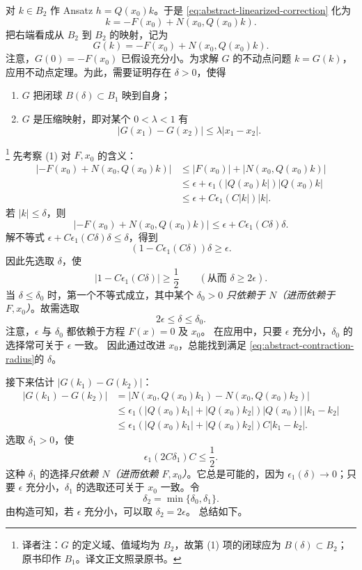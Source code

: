 对 $k\in B_2$ 作 Ansatz $h=Q(x_0)k$。于是
\eqref{eq:abstract-linearized-correction} 化为
\begin{equation}
 k=-F(x_0)+N(x_0,Q(x_0)k).
 \label{eq:abstract-fixed-point-equation}
\end{equation}
把右端看成从 $B_2$ 到 $B_2$ 的映射，记为
\[
 G(k)=-F(x_0)+N(x_0,Q(x_0)k).
\]
注意，$G(0)=-F(x_0)$ 已假设充分小。为求解 $G$ 的不动点问题 $k=G(k)$，
应用\personPicard{}不动点定理。为此，需要证明存在 $\delta>0$，使得
\begin{enumerate}[label=(\arabic*)]
\item $G$ 把闭球 $B(\delta)\subset B_1$ 映到自身；
\item $G$ 是压缩映射，即对某个 $0<\lambda<1$ 有
\[
 |G(x_1)-G(x_2)|\leq\lambda|x_1-x_2|.
\]
\end{enumerate}
\footnote{译者注：$G$ 的定义域、值域均为 $B_2$，故第 (1) 项的闭球应为
$B(\delta)\subset B_2$；原书印作 $B_1$。译文正文照录原书。}
先考察 (1) 对 $F,x_0$ 的含义：
\[
\begin{aligned}
 |-F(x_0)+N(x_0,Q(x_0)k)|
 &\leq|F(x_0)|+|N(x_0,Q(x_0)k)|\\
 &\leq\epsilon+\epsilon_1(|Q(x_0)k|)|Q(x_0)k|\\
 &\leq\epsilon+C\epsilon_1(C|k|)|k|.
\end{aligned}
\]
若 $|k|\leq\delta$，则
\[
 |-F(x_0)+N(x_0,Q(x_0)k)|
 \leq\epsilon+C\epsilon_1(C\delta)\delta.
\]
解不等式 $\epsilon+C\epsilon_1(C\delta)\delta\leq\delta$，得到
\[
 (1-C\epsilon_1(C\delta))\delta\geq\epsilon.
\]
因此先选取 $\delta$，使
\[
 |1-C\epsilon_1(C\delta)|\geq\frac12
 \qquad(\text{从而 }\delta\geq2\epsilon).
\]
当 $\delta\leq\delta_0$ 时，第一个不等式成立，其中某个 $\delta_0>0$
\emph{只依赖于 $N$（进而依赖于 $F,x_0$）}。故需选取
\begin{equation}
 2\epsilon\leq\delta\leq\delta_0.
 \label{eq:abstract-contraction-radius}
\end{equation}
注意，$\epsilon$ 与 $\delta_0$ 都依赖于方程 $F(x)=0$ 及\termApproximateSolution{} $x_0$。
在应用中，只要 $\epsilon$ 充分小，$\delta_0$ 的选择常可关于 $\epsilon$ 一致。
因此通过改进\termApproximateSolution{} $x_0$，总能找到满足
\eqref{eq:abstract-contraction-radius}的 $\delta$。

接下来估计 $|G(k_1)-G(k_2)|$：
\[
\begin{aligned}
 |G(k_1)-G(k_2)|
 &=|N(x_0,Q(x_0)k_1)-N(x_0,Q(x_0)k_2)|\\
 &\leq\epsilon_1(|Q(x_0)k_1|+|Q(x_0)k_2|)
 |Q(x_0)|\,|k_1-k_2|\\
 &\leq\epsilon_1(|Q(x_0)k_1|+|Q(x_0)k_2|)C|k_1-k_2|.
\end{aligned}
\]
选取 $\delta_1>0$，使
\[
 \epsilon_1(2C\delta_1)C\leq\frac12.
\]
这种 $\delta_1$ 的选择\emph{只依赖 $N$（进而依赖 $F,x_0$）}。它总是可能的，因为
$\epsilon_1(\delta)\to0$；只要 $\epsilon$ 充分小，$\delta_1$ 的选取还可关于
$x_0$ 一致。令
\[
 \delta_2=\min\{\delta_0,\delta_1\}.
\]
由构造可知，若 $\epsilon$ 充分小，可以取 $\delta_2=2\epsilon$。
总结如下。

